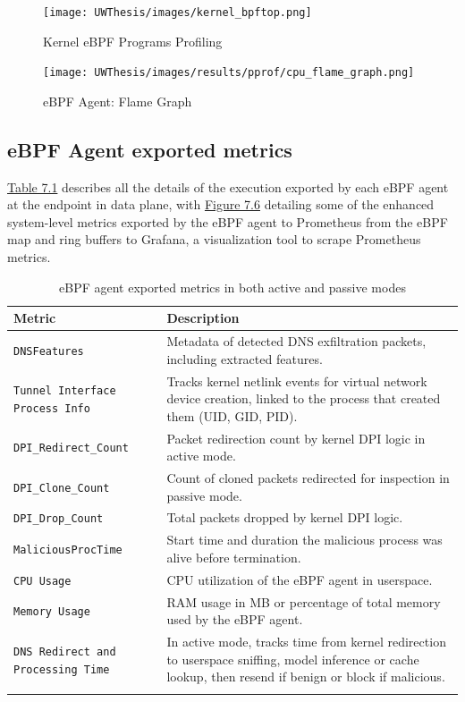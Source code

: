 \documentclass [11pt, proquest] {uwthesis}[2020/02/24]
\begin{document}
\begin{figure}[H]
    \centering
    \texttt{[image: UWThesis/images/kernel\_bpftop.png]}
    \caption{Kernel eBPF Programs Profiling}
    \label{fig:c3}
\end{figure}

\begin{figure}[H]
    \centering
    \texttt{[image: UWThesis/images/results/pprof/cpu\_flame\_graph.png]}
    \caption{eBPF Agent: Flame Graph}
    \label{fig:c4}
\end{figure}


\subsection{eBPF Agent exported metrics}
\hyperref[sec:dp_ebpf_node_metrics]{Table 7.1} describes all the details of the execution exported by each eBPF agent at the endpoint in data plane, with \hyperref[fig:dns-exfil-packet-metrics]{Figure 7.6} detailing some of the enhanced system-level metrics exported by the eBPF agent to Prometheus from the eBPF map and ring buffers to Grafana, a visualization tool to scrape Prometheus metrics.

\begin{longtable}{|p{4cm}|p{10cm}|}
\hline
\textbf{Metric} & \textbf{Description} \\
\hline
\texttt{DNSFeatures} & Metadata of detected DNS exfiltration packets, including extracted features. \\
\hline
\texttt{Tunnel Interface Process Info} & Tracks kernel netlink events for virtual network device creation, linked to the process that created them (UID, GID, PID). \\
\hline
\texttt{DPI\_Redirect\_Count} & Packet redirection count by kernel DPI logic in active mode. \\
\hline
\texttt{DPI\_Clone\_Count} & Count of cloned packets redirected for inspection in passive mode. \\
\hline
\texttt{DPI\_Drop\_Count} & Total packets dropped by kernel DPI logic. \\
\hline
\texttt{MaliciousProcTime} & Start time and duration the malicious process was alive before termination. \\
\hline
\texttt{CPU Usage} & CPU utilization of the eBPF agent in userspace. \\
\hline
\texttt{Memory Usage} & RAM usage in MB or percentage of total memory used by the eBPF agent. \\
\hline
\texttt{DNS Redirect and Processing Time} & In active mode, tracks time from kernel redirection to userspace sniffing, model inference or cache lookup, then resend if benign or block if malicious. \\
\hline
\caption{eBPF agent exported metrics in both active and passive modes}
\label{sec:dp_ebpf_node_metrics}
\end{longtable}
\end{document}
